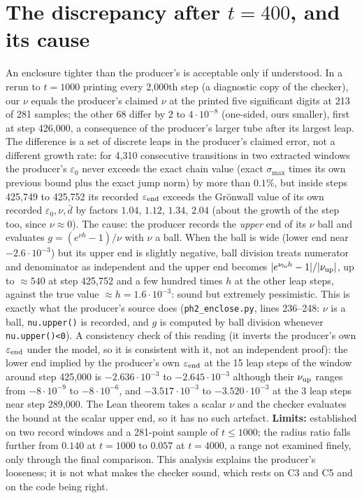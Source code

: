 \documentclass[11pt]{article}
\begin{document}
\section{The discrepancy after $t=400$, and its cause}
An enclosure tighter than the producer's is acceptable only if understood. In a rerun to $t=1000$ printing every 2{,}000th step (a diagnostic copy of the checker), our $\nu$ equals the producer's claimed $\nu$
at the printed five significant digits at 213 of 281 samples; the other 68 differ by $2$ to $4\cdot10^{-8}$ (one-sided, ours smaller), first at step 426{,}000, a consequence of the producer's larger tube after its largest leap. The difference is a set of
discrete leaps in the producer's claimed error, not a different growth rate: for 4{,}310 consecutive transitions in two extracted windows the producer's $\varepsilon_0$ never exceeds the exact chain
value (exact $\sigma_{\max}$ times its own previous bound plus the exact jump norm) by more than $0.1\%$, but inside steps 425{,}749 to 425{,}752 its recorded $\varepsilon_{\rm end}$ exceeds the Gr\"onwall value of its own recorded $\varepsilon_0,\nu,\bar d$ by factors $1.04$, $1.12$,
$1.34$, $2.04$ (about the growth of the step too, since $\nu\approx0$).
The cause: the producer records the \emph{upper} end of its $\nu$ ball and evaluates $g=(e^{\nu h}-1)/\nu$ with $\nu$ a ball. When the ball is wide (lower end near $-2.6\cdot10^{-3}$) but its upper end is slightly negative,
ball division treats numerator and denominator as independent and the upper end becomes $|e^{\nu_{\rm lo}h}-1|/|\nu_{\rm up}|$, up to $\approx 540$ at step 425{,}752 and a few hundred times $h$ at the other leap steps, against the true value $\approx h=1.6\cdot10^{-3}$: sound but extremely pessimistic.
This is exactly what the producer's source does (\texttt{ph2\_enclose.py}, lines 236--248: $\nu$ is a ball, \texttt{nu.upper()} is recorded, and $g$ is computed by ball division whenever \texttt{nu.upper()<0}).
A consistency check of this reading (it inverts the producer's own $\varepsilon_{\rm end}$ under the model, so it is consistent with it, not an independent proof): the lower end implied by the producer's own $\varepsilon_{\rm end}$ at the 15 leap steps of the window around step 425{,}000 is $-2.636\cdot10^{-3}$ to $-2.645\cdot10^{-3}$ although their
$\nu_{\rm up}$ ranges from $-8\cdot10^{-9}$ to $-8\cdot10^{-6}$, and $-3.517\cdot10^{-3}$ to $-3.520\cdot10^{-3}$ at the 3 leap steps near step 289{,}000. The Lean theorem takes a scalar $\nu$ and the checker evaluates the bound at the scalar upper end, so it has no such artefact.
\textbf{Limits:} established on two record windows and a 281-point sample of $t\le1000$; the radius ratio falls further from $0.140$ at $t=1000$ to $0.057$ at $t=4000$, a range not examined finely, only through the final comparison. This analysis explains the producer's looseness;
it is not what makes the checker sound, which rests on C3 and C5 and on the code being right.
\end{document}
